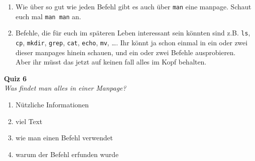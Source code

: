 \begin{spiel}
    \begin{enumerate}
        \item Wie über so gut wie jeden Befehl gibt es auch über \texttt{man} eine
              manpage. Schaut euch mal \texttt{man man} an.
        \item Befehle, die für euch im späteren Leben interessant sein könnten sind
              z.B. \texttt{ls}, \texttt{cp}, \texttt{mkdir}, \texttt{grep}, \texttt{cat},
              \texttt{echo}, \texttt{mv}, \dots. Ihr könnt ja schon einmal in ein
              oder zwei dieser manpages hinein schauen, und ein oder zwei Befehle
              ausprobieren. Aber ihr müsst das jetzt auf keinen fall alles im Kopf
              behalten.
    \end{enumerate}
\end{spiel}

\textbf{Quiz 6}\\
\textit{Was findet man alles in einer Manpage?}
\begin{enumerate}[label=\alph*)]
    \item Nützliche Informationen
    \item viel Text
    \item wie man einen Befehl verwendet
    \item warum der Befehl erfunden wurde
\end{enumerate}
